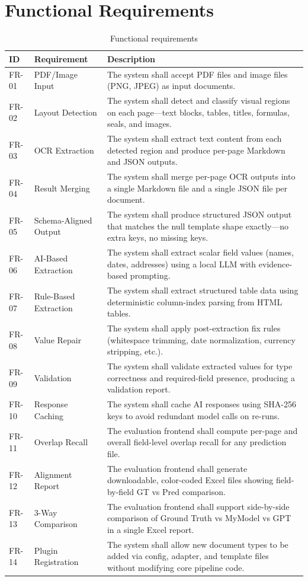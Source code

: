 \documentclass[12pt,a4paper]{report}
\begin{document}
\chapter{Functional Requirements}

\begin{table}[H]
\centering\small\sffamily
\begin{tabularx}{\textwidth}{l l X}
\toprule
\textbf{ID} & \textbf{Requirement} & \textbf{Description} \\
\midrule
FR-01 & PDF/Image Input & The system shall accept PDF files and image files (PNG, JPEG) as input documents. \\
FR-02 & Layout Detection & The system shall detect and classify visual regions on each page---text blocks, tables, titles, formulas, seals, and images. \\
FR-03 & OCR Extraction & The system shall extract text content from each detected region and produce per-page Markdown and JSON outputs. \\
FR-04 & Result Merging & The system shall merge per-page OCR outputs into a single Markdown file and a single JSON file per document. \\
FR-05 & Schema-Aligned Output & The system shall produce structured JSON output that matches the null template shape exactly---no extra keys, no missing keys. \\
FR-06 & AI-Based Extraction & The system shall extract scalar field values (names, dates, addresses) using a local LLM with evidence-based prompting. \\
FR-07 & Rule-Based Extraction & The system shall extract structured table data using deterministic column-index parsing from HTML tables. \\
FR-08 & Value Repair & The system shall apply post-extraction fix rules (whitespace trimming, date normalization, currency stripping, etc.). \\
FR-09 & Validation & The system shall validate extracted values for type correctness and required-field presence, producing a validation report. \\
FR-10 & Response Caching & The system shall cache AI responses using SHA-256 keys to avoid redundant model calls on re-runs. \\
FR-11 & Overlap Recall & The evaluation frontend shall compute per-page and overall field-level overlap recall for any prediction file. \\
FR-12 & Alignment Report & The evaluation frontend shall generate downloadable, color-coded Excel files showing field-by-field GT vs Pred comparison. \\
FR-13 & 3-Way Comparison & The evaluation frontend shall support side-by-side comparison of Ground Truth vs MyModel vs GPT in a single Excel report. \\
FR-14 & Plugin Registration & The system shall allow new document types to be added via config, adapter, and template files without modifying core pipeline code. \\
\bottomrule
\end{tabularx}
\caption{Functional requirements}
\end{table}
\end{document}
